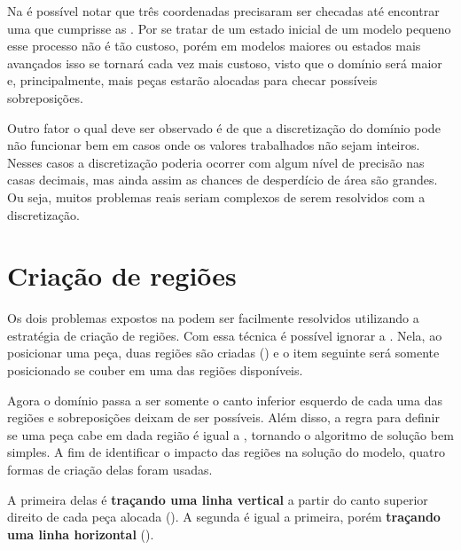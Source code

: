 Na  é possível notar que três coordenadas precisaram ser checadas
até encontrar uma que cumprisse as .
Por se tratar de um estado inicial de um modelo pequeno esse processo não é tão custoso, porém em
modelos maiores ou estados mais avançados isso se tornará cada vez mais custoso, visto que o domínio
será maior e, principalmente, mais peças estarão alocadas para checar possíveis sobreposições.



Outro fator o qual deve ser observado é de que a discretização do domínio pode não funcionar bem em
casos onde os valores trabalhados não sejam inteiros.
Nesses casos a discretização poderia ocorrer com algum nível de precisão nas casas decimais,
mas ainda assim as chances de desperdício de área são grandes.
Ou seja, muitos problemas reais seriam complexos de serem resolvidos com a discretização.


\section{Criação de regiões}\label{sec:criacao-de-regioes}

Os dois problemas expostos na  podem ser facilmente
resolvidos utilizando a estratégia de criação de regiões.
Com essa técnica é possível ignorar a .
Nela, ao posicionar uma peça, duas regiões são criadas () e o item
seguinte será somente posicionado se couber em uma das regiões disponíveis.



Agora o domínio passa a ser somente o canto inferior esquerdo de cada uma das regiões e
sobreposições deixam de ser possíveis.
Além disso, a regra para definir se uma peça cabe em dada região é igual a , tornando
o algoritmo de solução bem simples.
A fim de identificar o impacto das regiões na solução do modelo, quatro formas de criação
delas foram usadas.

A primeira delas é \textbf{traçando uma linha vertical} a partir do canto superior direito de cada
peça alocada ().
A segunda é igual a primeira, porém \textbf{traçando uma linha horizontal} ().



